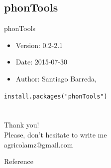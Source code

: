 \subsection{phonTools}
\begin{frame}{phonTools}
\begin{itemize}
\item Version: 0.2-2.1
\item Date: 2015-07-30
\item Author: Santiago Barreda, \citep{barreda15}
\end{itemize}
\vfill
\texttt{install.packages("phonTools")}
\end{frame}

\section{}
\begin{frame}
{\huge Thank you!\bigskip\\
\normalsize Please, don't hesitate to write me\\
agricolamz@gmail.com
\vspace{-130pt}}
\end{frame}
\begin{frame}{Reference}
\footnotesize


\end{frame}

